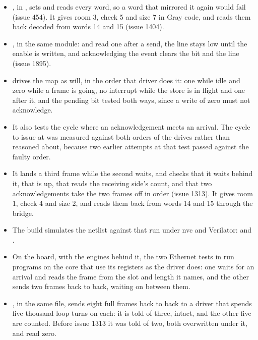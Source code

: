 \begin{itemize}
\item {}, in
, sets  and reads
every word, so a word that mirrored it again would fail (issue 454).
It gives  room 3, check 5 and size 7 in Gray code, and
reads them back decoded from words 14 and 15 (issue 1404).
\item {},
in the same module:  and 
read one after a send, the line stays low until the enable is written,
and acknowledging the event clears the bit and the line (issue 1895).
\item {} drives the map as
 will, in the order that driver does it:
 one while idle and zero while a frame is going, no
interrupt while the store is in flight and one after it, and the
pending bit tested both ways, since a write of zero must not
acknowledge.
\item It also tests the cycle where an acknowledgement meets an
arrival. The cycle to issue at was measured against both orders of
the drives rather than reasoned about, because two earlier attempts
at that test passed against the faulty order.
\item It lands a third frame while the second waits, and checks that
it waits behind it, that  is up, that
 reads the receiving side's count, and that two
acknowledgements take the two frames off in order (issue 1313). It
gives  room 1, check 4 and size 2, and reads them back
from words 14 and 15 through the bridge.
\item The build simulates the netlist against that run under nvc and
Verilator:  and
.
\item On the board, with the engines behind it, the two Ethernet tests
in  run programs on the core that
use its registers as the driver does: one waits for an arrival and
reads the frame from the slot and length it names, and the other
sends two frames back to back, waiting on  between
them.
\item {},
in the same file, sends eight full frames back to back to a driver
that spends five thousand loop turns on each: it is told of three,
intact, and the other five are counted. Before issue 1313 it was told
of two, both overwritten under it, and  read zero.
\end{itemize}

